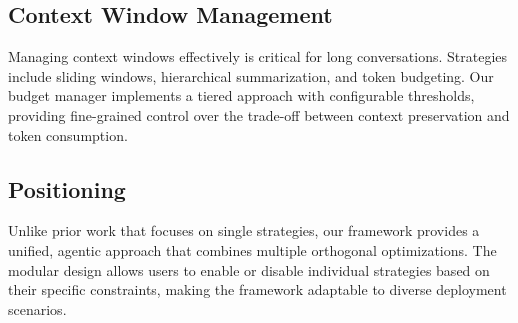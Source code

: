 \subsection{Context Window Management}

Managing context windows effectively is critical for long conversations. Strategies include sliding windows, hierarchical summarization, and token budgeting. Our budget manager implements a tiered approach with configurable thresholds, providing fine-grained control over the trade-off between context preservation and token consumption.

\subsection{Positioning}

Unlike prior work that focuses on single strategies, our framework provides a unified, agentic approach that combines multiple orthogonal optimizations. The modular design allows users to enable or disable individual strategies based on their specific constraints, making the framework adaptable to diverse deployment scenarios.
